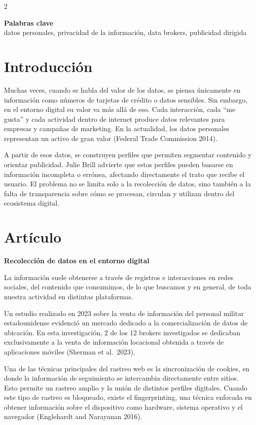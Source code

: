 \documentclass[10pt,spanish,Letterpaper,openany]{book}
\let\origtextbf\textbf
\renewcommand{\textbf}[1]{{\color{textlinetitle}\origtextbf{#1}}}
\begin{document}
\begin {multicols}{2}

\textbf{Palabras clave}\\
datos personales, privacidad de la información, data brokers, publicidad dirigida

\section{Introducción}\label{introducciuxf3n-15}

Muchas veces, cuando se habla del valor de los datos, se piensa únicamente en información como números de tarjetas de crédito o datos sensibles. Sin embargo, en el entorno digital su valor va más allá de eso. Cada interacción, cada ``me gusta'' y cada actividad dentro de internet produce datos relevantes para empresas y campañas de marketing. En la actualidad, los datos personales representan un activo de gran valor (Federal Trade Commission 2014).

A partir de esos datos, se construyen perfiles que permiten segmentar contenido y orientar publicidad. Julie Brill advierte que estos perfiles pueden basarse en información incompleta o errónea, afectando directamente el trato que recibe el usuario. El problema no se limita solo a la recolección de datos, sino también a la falta de transparencia sobre cómo se procesan, circulan y utilizan dentro del ecosistema digital.

\section{Artículo}\label{artuxedculo-9}

\textbf{Recolección de datos en el entorno digital}

La información suele obtenerse a través de registros e interacciones en redes sociales, del contenido que consumimos, de lo que buscamos y en general, de toda nuestra actividad en distintas plataformas.

Un estudio realizado en 2023 sobre la venta de información del personal militar estadounidense evidenció un mercado dedicado a la comercialización de datos de ubicación. En esta investigación, 2 de los 12 brokers investigados se dedicaban exclusivamente a la venta de información locacional obtenida a través de aplicaciones móviles (Sherman et al.~2023).

Una de las técnicas principales del rastreo web es la sincronización de cookies, en donde la información de seguimiento se intercambia directamente entre sitios. Esto permite un rastreo amplio y la unión de distintos perfiles digitales. Cuando este tipo de rastreo es bloqueado, existe el fingerprinting, una técnica enfocada en obtener información sobre el dispositivo como hardware, sistema operativo y el navegador (Englehardt and Narayanan 2016).


\end{multicols}
\end{document}
